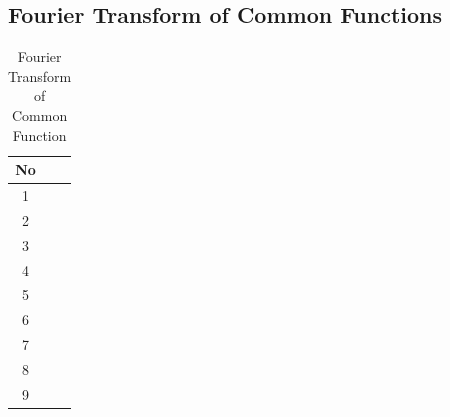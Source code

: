 \documentclass[margin,line]{res}
\newcommand*{\tabbox}[1]{\Gape[2.2pt]{#1}}
\newcommand*{\ftfunc}{{\mathscr{F}_f}}
\begin{document}
\begin{resume}
\subsection{\textbf{Fourier Transform of Common Functions}}
\begin{longtable}[c]{ccc}
	\caption{Fourier Transform of Common Function}
	\label{ft-func}\\
	\hline
	\endfirsthead
	\endhead
	No& \tabbox{$f(t)$} & \tabbox{$\ftfunc(\omega)$} \\ \hline
	1 & \tabbox{$e^{-at}$} & \tabbox{$\frac{1}{a+j\omega}$} \\
	2 & \tabbox{$e^{-a\left|t\right|}$} & \tabbox{$\frac{2a}{a^2+\omega^2}$} \\
	3 & \tabbox{$rect\left(\frac{t}{\tau}\right)$} & \tabbox{$\tau Sa(\frac{\omega\tau}{2})$} \\
	4 & \tabbox{$\delta(t)$} & \tabbox{$1$} \\
	5 & \tabbox{$sgn(t)$} & \tabbox{$\frac{2}{j\omega}$} \\
	6 & \tabbox{$u(t)$} & \tabbox{$\pi\delta(\omega)+\frac{1}{j\omega}$} \\
	7 & \tabbox{$cos(\omega_0 t)$} & \tabbox{$\pi\left[ \delta(\omega+\omega_0) + \delta(\omega-\omega_0) \right]$} \\
	8 & \tabbox{$sin(\omega_0 t)$} & \tabbox{$j\pi\left[ \delta(\omega+\omega_0) - \delta(\omega-\omega_0) \right]$} \\
	9 & \tabbox{$\frac{1}{t}$} & \tabbox{$-j\pi sgn(\omega)$} \\
	\hline
\end{longtable}
\clearpage

\end{resume}
\end{document}
